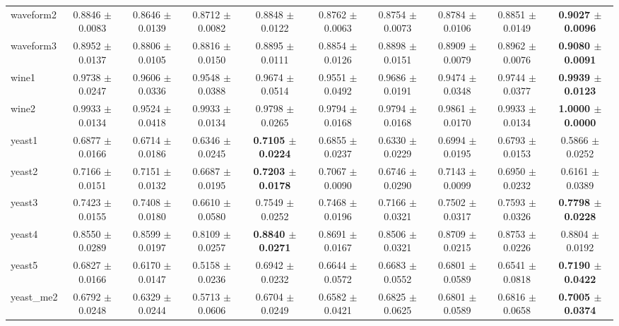 \begin{table*}[htbp]
{\begin{tabular}{lccccccccc}
            waveform2 & 0.8846 $\pm$ 0.0083 & 0.8646 $\pm$ 0.0139 & 0.8712 $\pm$ 0.0082 & 0.8848 $\pm$ 0.0122 & 0.8762 $\pm$ 0.0063 & 0.8754 $\pm$ 0.0073 & 0.8784 $\pm$ 0.0106 & 0.8851 $\pm$ 0.0149 & \cellcolor{graybg}\textbf{0.9027 $\pm$ 0.0096} \\ 
            waveform3 & 0.8952 $\pm$ 0.0137 & 0.8806 $\pm$ 0.0105 & 0.8816 $\pm$ 0.0150 & 0.8895 $\pm$ 0.0111 & 0.8854 $\pm$ 0.0126 & 0.8898 $\pm$ 0.0151 & 0.8909 $\pm$ 0.0079 & 0.8962 $\pm$ 0.0076 & \cellcolor{graybg}\textbf{0.9080 $\pm$ 0.0091} \\ 
            wine1 & 0.9738 $\pm$ 0.0247 & 0.9606 $\pm$ 0.0336 & 0.9548 $\pm$ 0.0388 & 0.9674 $\pm$ 0.0514 & 0.9551 $\pm$ 0.0492 & 0.9686 $\pm$ 0.0191 & 0.9474 $\pm$ 0.0348 & 0.9744 $\pm$ 0.0377 & \cellcolor{graybg}\textbf{0.9939 $\pm$ 0.0123} \\ 
            wine2 & 0.9933 $\pm$ 0.0134 & 0.9524 $\pm$ 0.0418 & 0.9933 $\pm$ 0.0134 & 0.9798 $\pm$ 0.0265 & 0.9794 $\pm$ 0.0168 & 0.9794 $\pm$ 0.0168 & 0.9861 $\pm$ 0.0170 & 0.9933 $\pm$ 0.0134 & \cellcolor{graybg}\textbf{1.0000 $\pm$ 0.0000} \\ 
            yeast1 & 0.6877 $\pm$ 0.0166 & 0.6714 $\pm$ 0.0186 & 0.6346 $\pm$ 0.0245 & \cellcolor{graybg}\textbf{0.7105 $\pm$ 0.0224} & 0.6855 $\pm$ 0.0237 & 0.6330 $\pm$ 0.0229 & 0.6994 $\pm$ 0.0195 & 0.6793 $\pm$ 0.0153 & 0.5866 $\pm$ 0.0252 \\
            yeast2 & 0.7166 $\pm$ 0.0151 & 0.7151 $\pm$ 0.0132 & 0.6687 $\pm$ 0.0195 & \cellcolor{graybg}\textbf{0.7203 $\pm$ 0.0178} & 0.7067 $\pm$ 0.0090 & 0.6746 $\pm$ 0.0290 & 0.7143 $\pm$ 0.0099 & 0.6950 $\pm$ 0.0232 & 0.6161 $\pm$ 0.0389 \\ 
            yeast3 & 0.7423 $\pm$ 0.0155 & 0.7408 $\pm$ 0.0180 & 0.6610 $\pm$ 0.0580 & 0.7549 $\pm$ 0.0252 & 0.7468 $\pm$ 0.0196 & 0.7166 $\pm$ 0.0321 & 0.7502 $\pm$ 0.0317 & 0.7593 $\pm$ 0.0326 & \cellcolor{graybg}\textbf{0.7798 $\pm$ 0.0228} \\ 
            yeast4 & 0.8550 $\pm$ 0.0289 & 0.8599 $\pm$ 0.0197 & 0.8109 $\pm$ 0.0257 & \cellcolor{graybg}\textbf{0.8840 $\pm$ 0.0271} & 0.8691 $\pm$ 0.0167 & 0.8506 $\pm$ 0.0321 & 0.8709 $\pm$ 0.0215 & 0.8753 $\pm$ 0.0226 & 0.8804 $\pm$ 0.0192 \\ 
            yeast5 & 0.6827 $\pm$ 0.0166 & 0.6170 $\pm$ 0.0147 & 0.5158 $\pm$ 0.0236 & 0.6942 $\pm$ 0.0232 & 0.6644 $\pm$ 0.0572 & 0.6683 $\pm$ 0.0552 & 0.6801 $\pm$ 0.0589 & 0.6541 $\pm$ 0.0818 & \cellcolor{graybg}\textbf{0.7190 $\pm$ 0.0422} \\ 
            yeast\_me2 & 0.6792 $\pm$ 0.0248 & 0.6329 $\pm$ 0.0244 & 0.5713 $\pm$ 0.0606 & 0.6704 $\pm$ 0.0249 & 0.6582 $\pm$ 0.0421 & 0.6825 $\pm$ 0.0625 & 0.6801 $\pm$ 0.0589 & 0.6816 $\pm$ 0.0658 & \cellcolor{graybg}\textbf{0.7005 $\pm$ 0.0374} \\
        \bottomrule
    \end{tabular}
    }
\end{table*}

